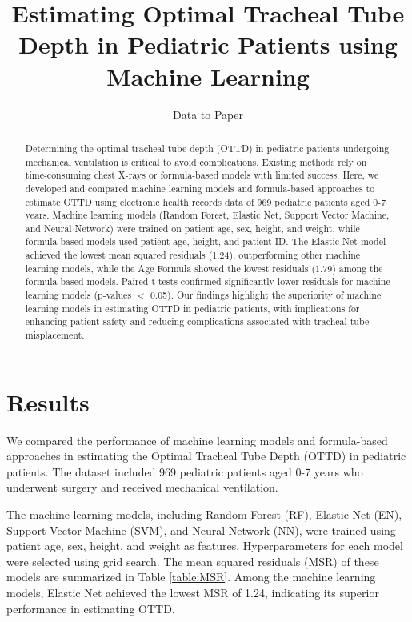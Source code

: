\documentclass[11pt]{article}
\title{Estimating Optimal Tracheal Tube Depth in Pediatric Patients using Machine Learning}
\author{Data to Paper}
\begin{document}
\maketitle
\begin{abstract}
Determining the optimal tracheal tube depth (OTTD) in pediatric patients undergoing mechanical ventilation is critical to avoid complications. Existing methods rely on time-consuming chest X-rays or formula-based models with limited success. Here, we developed and compared machine learning models and formula-based approaches to estimate OTTD using electronic health records data of 969 pediatric patients aged 0-7 years. Machine learning models (Random Forest, Elastic Net, Support Vector Machine, and Neural Network) were trained on patient age, sex, height, and weight, while formula-based models used patient age, height, and patient ID. The Elastic Net model achieved the lowest mean squared residuals (1.24), outperforming other machine learning models, while the Age Formula showed the lowest residuals (1.79) among the formula-based models. Paired t-tests confirmed significantly lower residuals for machine learning models (p-values $<$ 0.05). Our findings highlight the superiority of machine learning models in estimating OTTD in pediatric patients, with implications for enhancing patient safety and reducing complications associated with tracheal tube misplacement.
\end{abstract}
\section*{Results}

We compared the performance of machine learning models and formula-based approaches in estimating the Optimal Tracheal Tube Depth (OTTD) in pediatric patients. The dataset included 969 pediatric patients aged 0-7 years who underwent surgery and received mechanical ventilation. 

The machine learning models, including Random Forest (RF), Elastic Net (EN), Support Vector Machine (SVM), and Neural Network (NN), were trained using patient age, sex, height, and weight as features. Hyperparameters for each model were selected using grid search. The mean squared residuals (MSR) of these models are summarized in Table \ref{table:MSR}. Among the machine learning models, Elastic Net achieved the lowest MSR of 1.24, indicating its superior performance in estimating OTTD.
\end{document}
